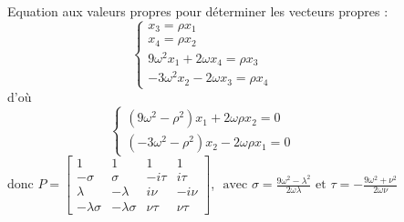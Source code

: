 \documentclass{beamer}
\begin{document}
\begin{frame}
{\begin{columns}[T]
			Equation aux valeurs propres pour déterminer les vecteurs propres :
			\begin{equation*}
				\begin{cases}
					x_3 = \rho x_1
					\\
					x_4 = \rho x_2
					\\
					9\omega^2 x_1 + 2\omega x_4 = \rho x_3
					\\
					-3\omega^2 x_2 -2\omega x_3 = \rho x_4	
				\end{cases}
			\end{equation*}
			d'où
			\begin{equation*}
				\begin{cases}
					(9\omega^2-\rho^2) x_1 + 2\omega \rho x_2 = 0
					\\
					(-3\omega^2-\rho^2) x_2 -2\omega \rho x_1 =	0
				\end{cases}
			\end{equation*}
			donc $P = \begin{bmatrix}
					1 & 1 & 1 & 1 \\
					-\sigma & \sigma & -i\tau & i\tau \\
					\lambda & -\lambda & i\nu & -i\nu \\
					-\lambda\sigma & -\lambda\sigma & \nu\tau & \nu\tau
				\end{bmatrix}$, $\text{ avec } \sigma = \frac{9\omega^2-\lambda^2}{2\omega\lambda} \text{ et } \tau = -\frac{9\omega^2+\nu^2}{2\omega\nu}$
			
		\end{columns}
		}
	\end{frame}
	
\end{document}
